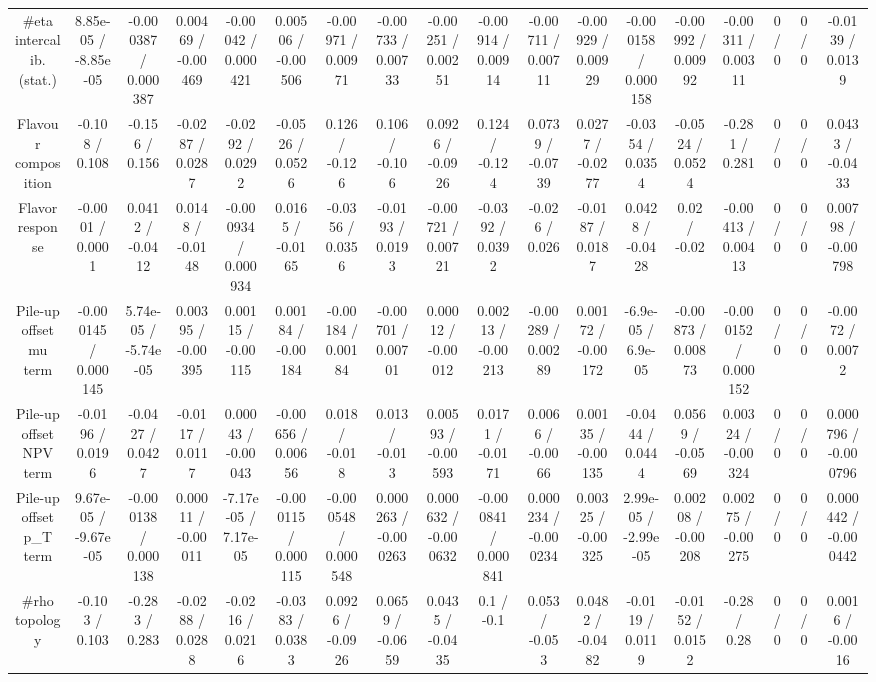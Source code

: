 \documentclass[10pt]{article}
\begin{document}
\begin{table}[htbp]
\begin{center}
\begin{tabular}{|c|c|c|c|c|c|c|c|c|c|c|c|c|c|c|c|c|c|}
  #eta intercalib. (stat.) & 8.85e-05 / -8.85e-05 & -0.000387 / 0.000387 & 0.00469 / -0.00469 & -0.00042 / 0.000421 & 0.00506 / -0.00506 & -0.00971 / 0.00971 & -0.00733 / 0.00733 & -0.00251 / 0.00251 & -0.00914 / 0.00914 & -0.00711 / 0.00711 & -0.00929 / 0.00929 & -0.000158 / 0.000158 & -0.00992 / 0.00992 & -0.00311 / 0.00311 & 0 / 0 & 0 / 0 & -0.0139 / 0.0139 \\ 
  Flavour composition & -0.108 / 0.108 & -0.156 / 0.156 & -0.0287 / 0.0287 & -0.0292 / 0.0292 & -0.0526 / 0.0526 & 0.126 / -0.126 & 0.106 / -0.106 & 0.0926 / -0.0926 & 0.124 / -0.124 & 0.0739 / -0.0739 & 0.0277 / -0.0277 & -0.0354 / 0.0354 & -0.0524 / 0.0524 & -0.281 / 0.281 & 0 / 0 & 0 / 0 & 0.0433 / -0.0433 \\ 
  Flavor response & -0.0001 / 0.0001 & 0.0412 / -0.0412 & 0.0148 / -0.0148 & -0.000934 / 0.000934 & 0.0165 / -0.0165 & -0.0356 / 0.0356 & -0.0193 / 0.0193 & -0.00721 / 0.00721 & -0.0392 / 0.0392 & -0.026 / 0.026 & -0.0187 / 0.0187 & 0.0428 / -0.0428 & 0.02 / -0.02 & -0.00413 / 0.00413 & 0 / 0 & 0 / 0 & 0.00798 / -0.00798 \\ 
  Pile-up offset mu term & -0.000145 / 0.000145 & 5.74e-05 / -5.74e-05 & 0.00395 / -0.00395 & 0.00115 / -0.00115 & 0.00184 / -0.00184 & -0.00184 / 0.00184 & -0.00701 / 0.00701 & 0.00012 / -0.00012 & 0.00213 / -0.00213 & -0.00289 / 0.00289 & 0.00172 / -0.00172 & -6.9e-05 / 6.9e-05 & -0.00873 / 0.00873 & -0.000152 / 0.000152 & 0 / 0 & 0 / 0 & -0.0072 / 0.0072 \\ 
  Pile-up offset NPV term & -0.0196 / 0.0196 & -0.0427 / 0.0427 & -0.0117 / 0.0117 & 0.00043 / -0.00043 & -0.00656 / 0.00656 & 0.018 / -0.018 & 0.013 / -0.013 & 0.00593 / -0.00593 & 0.0171 / -0.0171 & 0.0066 / -0.0066 & 0.00135 / -0.00135 & -0.0444 / 0.0444 & 0.0569 / -0.0569 & 0.00324 / -0.00324 & 0 / 0 & 0 / 0 & 0.000796 / -0.000796 \\ 
  Pile-up offset p_{T} term & 9.67e-05 / -9.67e-05 & -0.000138 / 0.000138 & 0.00011 / -0.00011 & -7.17e-05 / 7.17e-05 & -0.000115 / 0.000115 & -0.000548 / 0.000548 & 0.000263 / -0.000263 & 0.000632 / -0.000632 & -0.000841 / 0.000841 & 0.000234 / -0.000234 & 0.00325 / -0.00325 & 2.99e-05 / -2.99e-05 & 0.00208 / -0.00208 & 0.00275 / -0.00275 & 0 / 0 & 0 / 0 & 0.000442 / -0.000442 \\ 
  #rho topology & -0.103 / 0.103 & -0.283 / 0.283 & -0.0288 / 0.0288 & -0.0216 / 0.0216 & -0.0383 / 0.0383 & 0.0926 / -0.0926 & 0.0659 / -0.0659 & 0.0435 / -0.0435 & 0.1 / -0.1 & 0.053 / -0.053 & 0.0482 / -0.0482 & -0.0119 / 0.0119 & -0.0152 / 0.0152 & -0.28 / 0.28 & 0 / 0 & 0 / 0 & 0.0016 / -0.0016 \\ 

\end{tabular}
\end{center}
\end{table}
\end{document}
